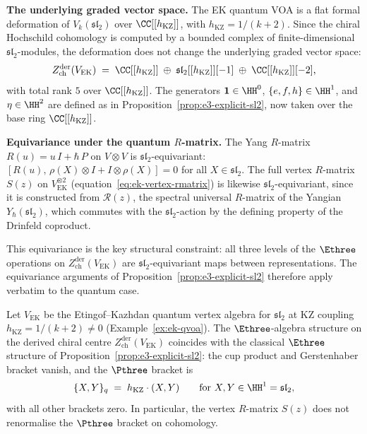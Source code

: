 \medskip
\noindent
\textbf{The underlying graded vector space.}
The EK quantum VOA is a flat formal deformation of
$V_k(\mathfrak{sl}_2)$ over $\CC[[h_{\mathrm{KZ}}]]$, with
$h_{\mathrm{KZ}} = 1/(k+2)$.
Since the chiral Hochschild cohomology is computed by
a bounded complex of finite-dimensional
$\mathfrak{sl}_2$-modules, the deformation does not
change the underlying graded vector space:
\begin{equation}\label{eq:ek-e3-graded}
  Z^{\mathrm{der}}_{\mathrm{ch}}(V_{\mathrm{EK}})
  \;=\;
  \CC[[h_{\mathrm{KZ}}]]
  \;\oplus\;
  \mathfrak{sl}_2[[h_{\mathrm{KZ}}]][-1]
  \;\oplus\;
  \CC[[h_{\mathrm{KZ}}]][-2],
\end{equation}
with total rank $5$ over $\CC[[h_{\mathrm{KZ}}]]$.
The generators
$\mathbf{1} \in \HH^0$, $\{e, f, h\} \in \HH^1$, and
$\eta \in \HH^2$ are defined as in
Proposition~\ref{prop:e3-explicit-sl2}, now taken
over the base ring $\CC[[h_{\mathrm{KZ}}]]$.

\medskip
\noindent
\textbf{Equivariance under the quantum $R$-matrix.}
The Yang $R$-matrix $R(u) = u\,I + \hbar\,P$ on
$V \otimes V$ is $\mathfrak{sl}_2$-equivariant:
$[R(u),\, \rho(X) \otimes I + I \otimes \rho(X)] = 0$
for all $X \in \mathfrak{sl}_2$.
The full vertex $R$-matrix
$S(z)$ on $V_{\mathrm{EK}}^{\otimes 2}$
(equation~\eqref{eq:ek-vertex-rmatrix}) is likewise
$\mathfrak{sl}_2$-equivariant, since it is constructed from
$\mathcal{R}(z)$, the spectral universal $R$-matrix of
the Yangian $Y_\hbar(\mathfrak{sl}_2)$, which
commutes with the $\mathfrak{sl}_2$-action by the
defining property of the Drinfeld coproduct.

This equivariance is the key structural constraint: all
three levels of the $\Ethree$ operations on
$Z^{\mathrm{der}}_{\mathrm{ch}}(V_{\mathrm{EK}})$ are
$\mathfrak{sl}_2$-equivariant maps between representations.
The equivariance arguments of
Proposition~\ref{prop:e3-explicit-sl2} therefore apply
verbatim to the quantum case.

\begin{proposition}
\label{prop:e3-ek-quantum}
Let $V_{\mathrm{EK}}$ be the Etingof--Kazhdan quantum
vertex algebra for $\mathfrak{sl}_2$ at KZ coupling
$h_{\mathrm{KZ}} = 1/(k+2) \neq 0$
\textup{(}Example~\textup{\ref{ex:ek-qvoa}}\textup{)}.
The $\Ethree$-algebra structure on the derived chiral
centre $Z^{\mathrm{der}}_{\mathrm{ch}}(V_{\mathrm{EK}})$
coincides with the classical $\Ethree$ structure of
Proposition~\textup{\ref{prop:e3-explicit-sl2}}: the
cup product and Gerstenhaber bracket vanish, and the
$\Pthree$ bracket is
\begin{equation}\label{eq:ek-p3-bracket}
  \{X, Y\}_q \;=\; h_{\mathrm{KZ}} \cdot (X, Y)
  \qquad
  \textup{for } X, Y \in \HH^1 = \mathfrak{sl}_2,
\end{equation}
with all other brackets zero. In particular, the
vertex $R$-matrix $S(z)$ does not renormalise the
$\Pthree$ bracket on cohomology.
\end{proposition}

